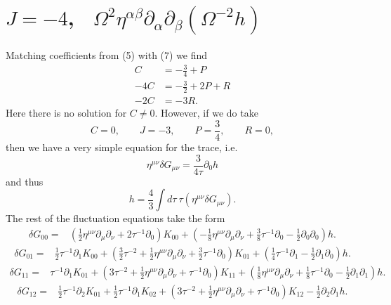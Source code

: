 \documentclass[10pt,letterpaper]{article}
\begin{document}
\section*{ $J=-4$, \ $\Omega^{2}\eta^{\alpha\beta}\partial_\alpha\partial_\beta (\Omega^{-2} h)$}
Matching coefficients from (5) with (7) we find
\begin{align}
	C &= -\frac34 + P\\
	-4C &= -\frac32 + 2P+R\\
	-2C &= -3R.
\end{align}
 Here there is no solution for $C\ne 0$. However, if we do take
 \begin{equation}
	C =0,\qquad J=-3,\qquad P =\frac34,\qquad R =0,
\end{equation}
then we have a very simple equation for the trace, i.e.
\begin{equation}
\eta^{\mu\nu}\delta G_{\mu\nu} = \frac{3}{4\tau} \partial_0 h
\end{equation}
and thus
\begin{equation}
	h =\frac43\int d\tau\ \tau (\eta^{\mu\nu}\delta G_{\mu\nu}).
\end{equation}
The rest of the fluctuation equations take the form
\begin{align}
\delta G_{00}={}&(\tfrac{1}{2} \eta^{\mu \nu} \partial_{\mu} \partial_{\nu}
 + 2 \tau^{-1} \partial_{0}) K_{00}
 + (- \tfrac{1}{8} \eta^{\mu \nu} \partial_{\mu} \partial_{\nu}
 + \tfrac{3}{8} \tau^{-1} \partial_{0}
 -  \tfrac{1}{2} \partial_{0} \partial_{0}) h.
\end{align}
\begin{align}
\delta G_{01}={}&\tfrac{1}{2} \tau^{-1} \partial_{1} K_{00}
 + (\tfrac{3}{2} \tau^{-2}
 + \tfrac{1}{2} \eta^{\mu \nu} \partial_{\mu} \partial_{\nu}
 + \tfrac{3}{2} \tau^{-1} \partial_{0}) K_{01}
 + (\tfrac{1}{4} \tau^{-1} \partial_{1}
 -  \tfrac{1}{2} \partial_{1} \partial_{0}) h.
\end{align}
\begin{align}
\delta G_{11}={}&\tau^{-1} \partial_{1} K_{01}
 + (3 \tau^{-2}
 + \tfrac{1}{2} \eta^{\mu \nu} \partial_{\mu} \partial_{\nu}
 + \tau^{-1} \partial_{0}) K_{11}
 + (\tfrac{1}{8} \eta^{\mu \nu} \partial_{\mu} \partial_{\nu}
 + \tfrac{1}{8} \tau^{-1} \partial_{0}
 -  \tfrac{1}{2} \partial_{1} \partial_{1}) h.
\end{align}
\begin{align}
\delta G_{12}={}&\tfrac{1}{2} \tau^{-1} \partial_{2} K_{01}
 + \tfrac{1}{2} \tau^{-1} \partial_{1} K_{02}
 + (3 \tau^{-2}
 + \tfrac{1}{2} \eta^{\mu \nu} \partial_{\mu} \partial_{\nu}
 + \tau^{-1} \partial_{0}) K_{12}
 -  \tfrac{1}{2} \partial_{2} \partial_{1} h.
\end{align}
\end{document}

